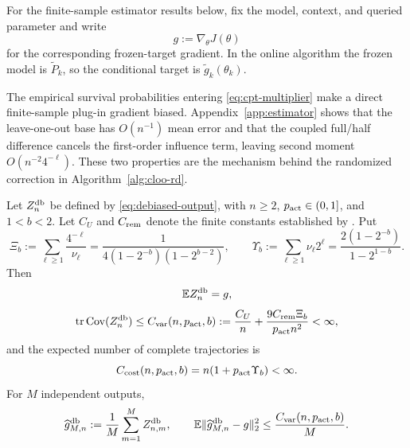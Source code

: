 For the finite-sample estimator results below, fix the model, context, and queried parameter and write
\[
 g:=\nabla_\theta J(\theta)
\]
for the corresponding frozen-target gradient.  In the online algorithm the frozen model is $\widetilde P_k$, so the conditional target is $\widetilde g_k(\theta_k)$.

The empirical survival probabilities entering \eqref{eq:cpt-multiplier} make a direct finite-sample plug-in gradient biased.  Appendix~\ref{app:estimator} shows that the leave-one-out base has $O(n^{-1})$ mean error and that the coupled full/half difference cancels the first-order influence term, leaving second moment $O(n^{-2}4^{-\ell})$.  These two properties are the mechanism behind the randomized correction in Algorithm~\ref{alg:cloo-rd}.

\begin{theorem}\label{thm:estimator}
Let $Z_n^{\mathrm{db}}$ be defined by \eqref{eq:debiased-output}, with $n\ge2$, $p_{\rm act}\in(0,1]$, and $1<b<2$.  Let $C_U$ and $C_{\rm rem}$ denote the finite constants established by .  Put
\begin{equation}\label{eq:level-series-constants}
 \Xi_b
 :=\sum_{\ell\ge1}\frac{4^{-\ell}}{\nu_\ell}
 =\frac{1}{4(1-2^{-b})(1-2^{b-2})},
 \qquad
 \Upsilon_b
 :=\sum_{\ell\ge1}\nu_\ell2^\ell
 =\frac{2(1-2^{-b})}{1-2^{1-b}}.
\end{equation}
Then
\begin{equation}\label{eq:estimator-unbiased}
 \mathbb E Z_n^{\mathrm{db}}=g,
\end{equation}
\begin{equation}\label{eq:single-output-variance}
 \operatorname{tr}\operatorname{Cov}(Z_n^{\mathrm{db}})
 \le C_{\rm var}(n,p_{\rm act},b)
 :=\frac{C_U}{n}+\frac{9C_{\rm rem}\Xi_b}{p_{\rm act} n^2}<\infty,
\end{equation}
and the expected number of complete trajectories is
\begin{equation}\label{eq:expected-estimator-cost}
 C_{\rm cost}(n,p_{\rm act},b)
 =n(1+p_{\rm act}\Upsilon_b)<\infty.
\end{equation}
For $M$ independent outputs,
\begin{equation}\label{eq:estimator-mse}
 \widehat g_{M,n}^{\mathrm{db}}:=\frac1M\sum_{m=1}^{M}Z_{n,m}^{\mathrm{db}},
 \qquad
 \mathbb E\lVert\widehat g_{M,n}^{\mathrm{db}}-g\rVert_2^2
 \le\frac{C_{\rm var}(n,p_{\rm act},b)}{M}.
\end{equation}
\end{theorem}

